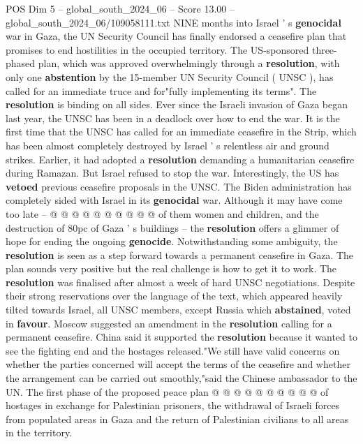 \begin{textsample}{POS Dim 5 – global\_south\_2024\_06 – Score 13.00 – global\_south\_2024\_06/109058111.txt}  \label{ex:f5_pos_228}
NINE months into Israel ' s \textbf{genocidal} war in Gaza, the UN Security Council has finally endorsed a ceasefire plan that promises to end hostilities in the occupied territory.
The US-sponsored three-phased plan, which was approved overwhelmingly through a \textbf{resolution}, with only one \textbf{abstention} by the 15-member UN Security Council ( UNSC ), has called for an immediate truce and for"fully implementing its terms".
The \textbf{resolution} is binding on all sides.
Ever since the Israeli invasion of Gaza began last year, the UNSC has been in a deadlock over how to end the war.
It is the first time that the UNSC has called for an immediate ceasefire in the Strip, which has been almost completely destroyed by Israel ' s relentless air and ground strikes.
Earlier, it had adopted a \textbf{resolution} demanding a humanitarian ceasefire during Ramazan.
But Israel refused to stop the war.
Interestingly, the US has \textbf{vetoed} previous ceasefire proposals in the UNSC.
The Biden administration has completely sided with Israel in its \textbf{genocidal} war.
Although it may have come too late -- @ @ @ @ @ @ @ @ @ @ of them women and children, and the destruction of 80pc of Gaza ' s buildings -- the \textbf{resolution} offers a glimmer of hope for ending the ongoing \textbf{genocide}.
Notwithstanding some ambiguity, the \textbf{resolution} is seen as a step forward towards a permanent ceasefire in Gaza.
The plan sounds very positive but the real challenge is how to get it to work.
The \textbf{resolution} was finalised after almost a week of hard UNSC negotiations.
Despite their strong reservations over the language of the text, which appeared heavily tilted towards Israel, all UNSC members, except Russia which \textbf{abstained}, voted in \textbf{favour}.
Moscow suggested an amendment in the \textbf{resolution} calling for a permanent ceasefire.
China said it supported the \textbf{resolution} because it wanted to see the fighting end and the hostages released."We still have valid concerns on whether the parties concerned will accept the terms of the ceasefire and whether the arrangement can be carried out smoothly,"said the Chinese ambassador to the UN.
The first phase of the proposed peace plan @ @ @ @ @ @ @ @ @ @ of hostages in exchange for Palestinian prisoners, the withdrawal of Israeli forces from populated areas in Gaza and the return of Palestinian civilians to all areas in the territory.

\end{textsample}
